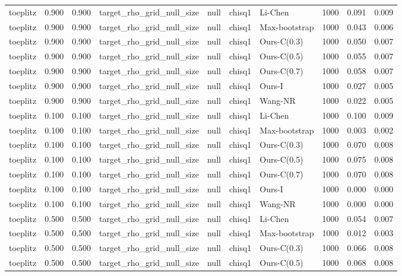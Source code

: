 \begin{tabular}{lrrllllrrr}
toeplitz & 0.900 & 0.900 & target\_rho\_grid\_null\_size & null & chisq1 & Li-Chen & 1000 & 0.091 & 0.009 \\
toeplitz & 0.900 & 0.900 & target\_rho\_grid\_null\_size & null & chisq1 & Max-bootstrap & 1000 & 0.043 & 0.006 \\
toeplitz & 0.900 & 0.900 & target\_rho\_grid\_null\_size & null & chisq1 & Ours-C(0.3) & 1000 & 0.050 & 0.007 \\
toeplitz & 0.900 & 0.900 & target\_rho\_grid\_null\_size & null & chisq1 & Ours-C(0.5) & 1000 & 0.055 & 0.007 \\
toeplitz & 0.900 & 0.900 & target\_rho\_grid\_null\_size & null & chisq1 & Ours-C(0.7) & 1000 & 0.058 & 0.007 \\
toeplitz & 0.900 & 0.900 & target\_rho\_grid\_null\_size & null & chisq1 & Ours-I & 1000 & 0.027 & 0.005 \\
toeplitz & 0.900 & 0.900 & target\_rho\_grid\_null\_size & null & chisq1 & Wang-NR & 1000 & 0.022 & 0.005 \\
toeplitz & 0.100 & 0.100 & target\_rho\_grid\_null\_size & null & chisq1 & Li-Chen & 1000 & 0.100 & 0.009 \\
toeplitz & 0.100 & 0.100 & target\_rho\_grid\_null\_size & null & chisq1 & Max-bootstrap & 1000 & 0.003 & 0.002 \\
toeplitz & 0.100 & 0.100 & target\_rho\_grid\_null\_size & null & chisq1 & Ours-C(0.3) & 1000 & 0.070 & 0.008 \\
toeplitz & 0.100 & 0.100 & target\_rho\_grid\_null\_size & null & chisq1 & Ours-C(0.5) & 1000 & 0.075 & 0.008 \\
toeplitz & 0.100 & 0.100 & target\_rho\_grid\_null\_size & null & chisq1 & Ours-C(0.7) & 1000 & 0.070 & 0.008 \\
toeplitz & 0.100 & 0.100 & target\_rho\_grid\_null\_size & null & chisq1 & Ours-I & 1000 & 0.000 & 0.000 \\
toeplitz & 0.100 & 0.100 & target\_rho\_grid\_null\_size & null & chisq1 & Wang-NR & 1000 & 0.000 & 0.000 \\
toeplitz & 0.500 & 0.500 & target\_rho\_grid\_null\_size & null & chisq1 & Li-Chen & 1000 & 0.054 & 0.007 \\
toeplitz & 0.500 & 0.500 & target\_rho\_grid\_null\_size & null & chisq1 & Max-bootstrap & 1000 & 0.012 & 0.003 \\
toeplitz & 0.500 & 0.500 & target\_rho\_grid\_null\_size & null & chisq1 & Ours-C(0.3) & 1000 & 0.066 & 0.008 \\
toeplitz & 0.500 & 0.500 & target\_rho\_grid\_null\_size & null & chisq1 & Ours-C(0.5) & 1000 & 0.068 & 0.008 \\

\end{tabular}
